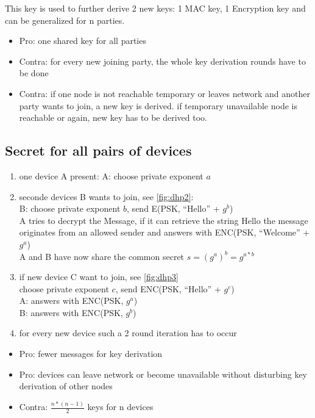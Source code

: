 This key is used to further derive 2 new keys: 1 MAC key, 1 Encryption key and can be 
generalized for n parties. 

\begin{itemize}
 \item Pro: one shared key for all parties
 \item Contra: for every new joining party, the whole key derivation rounds have to be done
 \item Contra: if one node is not reachable temporary or leaves network and another party wants to join, a new 
 key is derived. if temporary unavailable node is reachable or again, new key has to be derived too.
\end{itemize}

\subsection{Secret for all pairs of devices}

\begin{enumerate}
 \item one device A present:
 A: choose private exponent $a$ 
 \item seconde devices B wants to join, see \ref{fig:dhp2}:
 \\
 B: choose private exponent $b$, send E(PSK, ``Hello'' + $g^b$)
 \\
 A tries to decrypt the Message, if it can retrieve the string Hello the message originates from an allowed sender
  and answers with ENC(PSK, ``Welcome'' + $g^a$)
 \\
 A and B have now share the common secret $s = (g^a)^b = g^{a*b}$
 \\
 \item if new device C want to join, see \ref{fig:dhp3}
 \\
 choose private exponent $c$, send ENC(PSK, ``Hello'' + $g^c$)
\\
A: answers with ENC(PSK, $g^a$)
\\
B: answers with ENC(PSK, $g^b$)
 \item for every new device such a 2 round iteration has to occur
\end{enumerate}

\begin{itemize}
 \item Pro: fewer messages for key derivation
 \item Pro: devices can leave network or become unavailable without disturbing key derivation of other nodes
 \item Contra: $\frac{n*(n-1)}{2}$ keys for n devices
\end{itemize}

